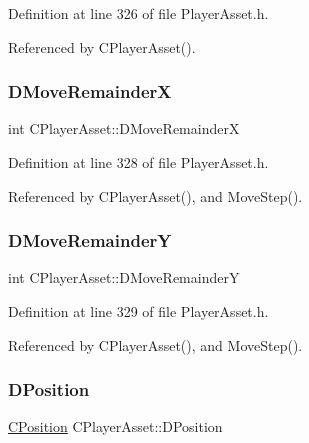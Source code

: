Definition at line 326 of file Player\+Asset.\+h.



Referenced by C\+Player\+Asset().

\hypertarget{classCPlayerAsset_aa57d93e239e9a80c362949f260471456}{}\label{classCPlayerAsset_aa57d93e239e9a80c362949f260471456} 
\subsubsection{\texorpdfstring{D\+Move\+RemainderX}{DMoveRemainderX}}
{\footnotesize\ttfamily int C\+Player\+Asset\+::\+D\+Move\+RemainderX\hspace{0.3cm}{\ttfamily [protected]}}



Definition at line 328 of file Player\+Asset.\+h.



Referenced by C\+Player\+Asset(), and Move\+Step().

\hypertarget{classCPlayerAsset_a282502fea7d02e38aa40a538a9c1565e}{}\label{classCPlayerAsset_a282502fea7d02e38aa40a538a9c1565e} 
\subsubsection{\texorpdfstring{D\+Move\+RemainderY}{DMoveRemainderY}}
{\footnotesize\ttfamily int C\+Player\+Asset\+::\+D\+Move\+RemainderY\hspace{0.3cm}{\ttfamily [protected]}}



Definition at line 329 of file Player\+Asset.\+h.



Referenced by C\+Player\+Asset(), and Move\+Step().

\hypertarget{classCPlayerAsset_aa9f53c009b181c7c5647c6b03776a04c}{}\label{classCPlayerAsset_aa9f53c009b181c7c5647c6b03776a04c} 
\subsubsection{\texorpdfstring{D\+Position}{DPosition}}
{\footnotesize\ttfamily \hyperlink{classCPosition}{C\+Position} C\+Player\+Asset\+::\+D\+Position\hspace{0.3cm}{\ttfamily [protected]}}



